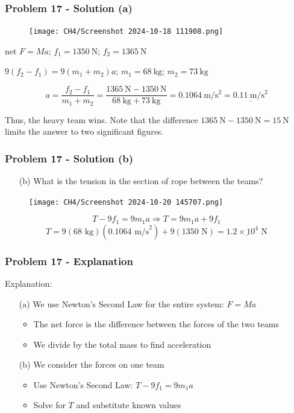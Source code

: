 \documentclass{beamer}
\begin{document}
\begin{}
\begin{frame}
\frametitle{Problem 17 - Solution (a)}
\begin{figure}
    \centering
    \texttt{[image: CH4/Screenshot 2024-10-18 111908.png]}
\end{figure}

net $F = Ma$; $f_1 = 1350 \mathrm{~N}$; $f_2 = 1365 \mathrm{~N}$

$9(f_2 - f_1) = 9(m_1 + m_2)a$; $m_1 = 68 \mathrm{~kg}$; $m_2 = 73 \mathrm{~kg}$

\begin{equation*}
a = \frac{f_2 - f_1}{m_1 + m_2} = \frac{1365 \mathrm{~N} - 1350 \mathrm{~N}}{68 \mathrm{~kg} + 73 \mathrm{~kg}} = 0.1064 \mathrm{~m} / \mathrm{s}^{2} = \underline{0.11 \mathrm{~m} / \mathrm{s}^{2}}
\end{equation*}

Thus, the heavy team wins. Note that the difference $1365 \mathrm{~N} - 1350 \mathrm{~N} = 15 \mathrm{~N}$ limits the answer to two significant figures.
\end{frame}

\begin{frame}
\frametitle{Problem 17 - Solution (b)}
\begin{itemize}
    \item[(b)] What is the tension in the section of rope between the teams?
\end{itemize}
\begin{figure}
    \centering
    \texttt{[image: CH4/Screenshot 2024-10-20 145707.png]}
\end{figure}

\begin{equation*}
T - 9f_1 = 9m_1a \Rightarrow T = 9m_1a + 9f_1
\end{equation*}
\begin{equation*}
T = 9(68 \text{ kg})(0.1064 \text{ m/s}^2) + 9(1350 \text{ N}) = \underline{1.2 \times 10^{4} \text{ N}}
\end{equation*}
\end{frame}

\begin{frame}
\frametitle{Problem 17 - Explanation}
Explanation:
\begin{itemize}
    \item[(a)] We use Newton's Second Law for the entire system: $F = Ma$
    \begin{itemize}
        \item The net force is the difference between the forces of the two teams
        \item We divide by the total mass to find acceleration
    \end{itemize}
    \item[(b)] We consider the forces on one team
    \begin{itemize}
        \item Use Newton's Second Law: $T - 9f_1 = 9m_1a$
        \item Solve for $T$ and substitute known values
    \end{itemize}
    \end{itemize}
\end{frame}


\end{}
\end{document}

